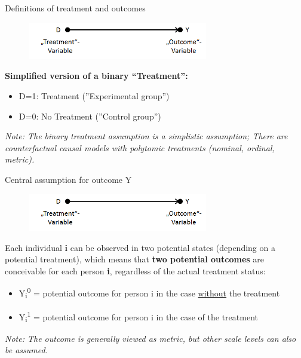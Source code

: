 \documentclass{beamer}\usepackage[]{graphicx}\usepackage[]{xcolor}
\begin{document}
\begin{frame}{Definitions of treatment and outcomes}
  \begin{figure}
	\centering
	\includegraphics[width=0.7\textwidth]{Graphics/D_on_Y_names.png}
  \end{figure}
\textbf{Simplified version of a binary “Treatment”:}
  \begin{itemize}
    \item D=1:	Treatment (''Experimental group'')
    \item D=0: No Treatment (''Control group'')
  \end{itemize}
\textit{Note: The binary treatment assumption is a simplistic assumption; There are counterfactual causal models with polytomic treatments (nominal, ordinal, metric).}
\end{frame}


\begin{frame}{Central assumption for outcome Y}
  \begin{figure}
	\centering
	\includegraphics[width=0.7\textwidth]{Graphics/D_on_Y_names.png}
  \end{figure}
Each individual \textbf{i} can be observed in two potential states (depending on a potential treatment), which means that \textbf{two potential outcomes} are conceivable for each person \textbf{i}, regardless of the actual treatment status:
  \begin{itemize}
    \item Y\textsubscript{i}\textsuperscript{0} = potential outcome for person i in the case \underline{without} the treatment
    \item Y\textsubscript{i}\textsuperscript{1} = potential outcome for person i in the case of the treatment
  \end{itemize}
\textit{Note: The outcome is generally viewed as metric, but other scale levels can also be assumed.}
\end{frame}
\end{document}
